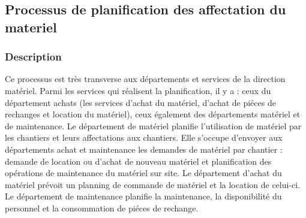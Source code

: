 				
				
				
		\subsection{Processus de planification des affectation du materiel}
				\subsubsection{Description}
				
				Ce processus est très transverse aux départements et services de la direction matériel.
				Parmi les services qui réalisent la planification, il y a : ceux du département achats (les services d'achat du matériel, d'achat de piéces de rechanges et location du matériel), ceux également des départements matériel et de maintenance.
				\newline
				Le département de matériel planifie l'utilisation de matériel par les chantiers et leurs affectations aux chantiers. Elle s'occupe d'envoyer aux départements achat et maintenance les demandes de matériel par chantier : demande de location ou d'achat de nouveau matériel et planification des opérations de maintenance du matériel sur site.
				\newline
				Le département d'achat du matériel prévoit un planning de commande de matériel et la location de celui-ci. 
				\newline
				Le département de maintenance planifie la maintenance, la disponibilité du personnel et la consommation de piéces de rechange.
				
				
				
